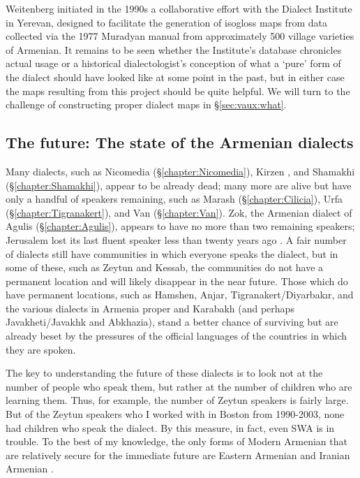 \documentclass[output=paper]{langscibook}
\begin{document}
Weitenberg initiated in the 1990s a collaborative effort with the Dialect Institute in Yerevan, designed to facilitate the generation of isogloss maps from data collected via the  1977 Muradyan manual \citep{MuradyanEtAl-1977-DialectologyBook} from approximately 500 village varieties of Armenian. It remains to be seen whether the Institute's database chronicles actual usage or a historical dialectologist's conception of what a `pure' form of the dialect should have looked like at some point in the past, but in either case the maps resulting from this project should be quite helpful. We will turn to the challenge of constructing proper dialect maps in   \S\ref{sec:vaux:what}. 


\subsection{The future: The state of the Armenian dialects}\label{sec:vaux:dialectology:fut}

Many dialects, such as Nicomedia (\S\ref{chapter:Nicomedia}), Kirzen \citep{Baghramyan-1958-KirzenDialect}, and Shamakhi (\S\ref{chapter:Shamakhi}),  appear to be already dead; many more are alive but have only a handful of speakers remaining, such as Marash (\S\ref{chapter:Cilicia}), Urfa (\S\ref{chapter:Tigranakert}), and Van (\S\ref{chapter:Van}). Zok, the Armenian dialect of Agulis (\S\ref{chapter:Agulis}), appears to have no more than two remaining speakers; Jerusalem lost its last fluent speaker less than twenty years ago \citep{Vaux-2002-ArmenianJerusalem}. A fair number of dialects still have communities in which everyone speaks the dialect, but in some of these, such as   Zeytun and Kessab, the communities do not have a permanent location and will likely disappear in the near future. Those which do have permanent locations, such as Hamshen,  Anjar, Tigranakert/Diyarbakır,  and the various dialects in Armenia proper and Karabakh (and perhaps Javakheti/Javakhk and Abkhazia), stand a better chance of surviving but are already beset by the pressures of the official languages of the countries in which they are spoken.

The key to understanding the future of these dialects is to look not at the number of people who speak them, but rather at the number of children who are learning them. Thus, for example, the number of Zeytun speakers is fairly large. But of the Zeytun speakers who I worked with in Boston from 1990-2003, none had children who speak the dialect. By this measure, in fact, even SWA is in trouble. To the best of my knowledge, the only forms of Modern Armenian that are relatively secure for the immediate future are Eastern Armenian and Iranian Armenian \citep{DolatianEtAl-prep-IranianGrammar}.
\end{document}
